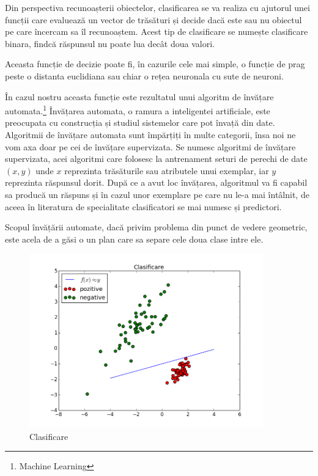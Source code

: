 Din perspectiva recunoașterii obiectelor, clasificarea se va realiza cu ajutorul unei funcții care evaluează un vector de trăsături și decide dacă este sau nu obiectul pe care încercam sa îl recunoaștem. 
Acest tip de clasificare se numește clasificare binara, findcă răspunsul nu poate lua decât doua valori.

Aceasta funcție de decizie poate fi, în cazurile cele mai simple, o funcție de prag peste o distanta euclidiana sau chiar o rețea neuronala cu sute de neuroni.

În cazul nostru aceasta funcție este rezultatul unui algoritm de învățare automata.\footnote{Machine Learning}
Învățarea automata, o ramura a inteligentei artificiale, este preocupata cu construcția și studiul sistemelor care pot învață din date.
Algoritmii de învățare automata sunt împărțiți în multe categorii, însa noi ne vom axa doar pe cei de învățare supervizata.
Se numesc algoritmi de învățare supervizata, acei algoritmi care folosesc la antrenament seturi de perechi de date ${(x,y)}$ unde ${x}$ reprezinta trăsăturile sau atributele unui exemplar, iar ${y}$ reprezinta răspunsul dorit. 
După ce a avut loc învățarea, algoritmul va fi capabil sa producă un răspuns și în cazul unor exemplare pe care nu le-a mai întâlnit, de aceea în literatura de specialitate clasificatori se mai numesc și predictori.

Scopul învățării automate, dacă privim problema din punct de vedere geometric, este acela de a găsi o un plan care sa separe cele doua clase intre ele.

\begin{figure}[h]
	\centering
		\includegraphics[width=0.90\textwidth]{imagini/fig_clasificare.png}
	\caption{Clasificare}
	\label{fig:fig_clasificare}
\end{figure}

